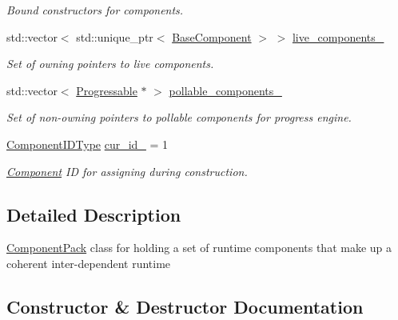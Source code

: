 \begin{DoxyCompactItemize}
\begin{DoxyCompactList}\small\item\em Bound constructors for components. \end{DoxyCompactList}\item 
std\+::vector$<$ std\+::unique\+\_\+ptr$<$ \hyperlink{structvt_1_1runtime_1_1component_1_1_base_component}{Base\+Component} $>$ $>$ \hyperlink{structvt_1_1runtime_1_1component_1_1_component_pack_a4df7d33cbf2efa5e0a93e335ecced3df}{live\+\_\+components\+\_\+}
\begin{DoxyCompactList}\small\item\em Set of owning pointers to live components. \end{DoxyCompactList}\item 
std\+::vector$<$ \hyperlink{structvt_1_1runtime_1_1component_1_1_progressable}{Progressable} $\ast$ $>$ \hyperlink{structvt_1_1runtime_1_1component_1_1_component_pack_a1ef5fa947ed75d4451289e70732374cb}{pollable\+\_\+components\+\_\+}
\begin{DoxyCompactList}\small\item\em Set of non-\/owning pointers to pollable components for progress engine. \end{DoxyCompactList}\item 
\hyperlink{namespacevt_ab6ac935c168b809c422d5121da4f2700}{Component\+I\+D\+Type} \hyperlink{structvt_1_1runtime_1_1component_1_1_component_pack_a4163295f78b9dbd6e135783cf6d2ccce}{cur\+\_\+id\+\_\+} = 1
\begin{DoxyCompactList}\small\item\em \hyperlink{structvt_1_1runtime_1_1component_1_1_component}{Component} ID for assigning during construction. \end{DoxyCompactList}\end{DoxyCompactItemize}


\subsection{Detailed Description}
{\ttfamily \hyperlink{structvt_1_1runtime_1_1component_1_1_component_pack}{Component\+Pack}} class for holding a set of runtime components that make up a coherent inter-\/dependent runtime 

\subsection{Constructor \& Destructor Documentation}
\mbox{\label{structvt_1_1runtime_1_1component_1_1_component_pack_a113f2da49d2033f09831b6807c92d330}} 
